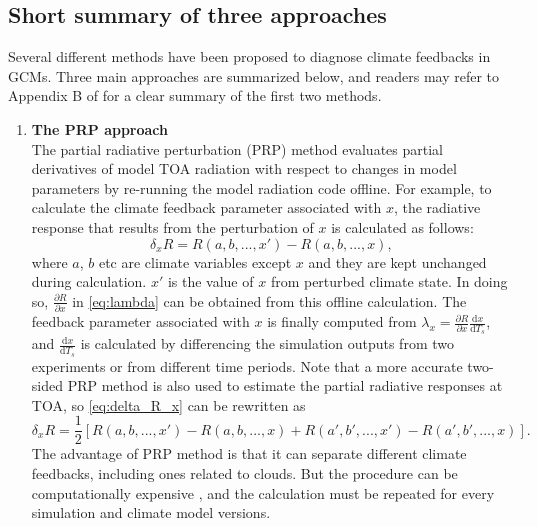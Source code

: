 \subsection{Short summary of three approaches}
\label{sec:three_climate_fbk_methods}

Several different methods have been proposed to diagnose climate feedbacks in GCMs. Three main approaches are summarized below, and readers may refer to Appendix B of \cite{Bony2006} for a clear summary of the first two methods.%

\begin{enumerate}[label={(\arabic*)}]
    \item \textbf{The PRP approach}\\
    The partial radiative perturbation (PRP)  method \citep{Wetherald1988cloud} evaluates partial derivatives of model TOA radiation with respect to changes in model parameters by re-running the model radiation code offline. For example, to calculate the climate feedback parameter associated with $x$, the radiative response that results from the perturbation of $x$ is calculated as follows:
    \begin{equation}
        \delta_x R = R(a,b,...,x') - R(a,b,...,x),
        \label{eq:delta_R_x}
    \end{equation}
    where $a$, $b$ etc are climate variables except $x$ and they are kept unchanged during calculation. $x'$ is the value of $x$ from perturbed climate state. In doing so, $\frac{\partial R}{\partial x}$ in \eqref{eq:lambda} can be obtained from this offline calculation. The feedback parameter associated with $x$ is finally computed from $\lambda_x = \frac{\partial R}{\partial x}\frac{\mathrm{d} x}{\mathrm{d} T_s}$, and $\frac{\mathrm{d} x}{\mathrm{d} T_s}$ is calculated by differencing the simulation outputs from two experiments or from different time periods. Note that a more accurate two-sided PRP method \citep{Colman1997} is also used to estimate the partial radiative responses at TOA, so \eqref{eq:delta_R_x} can be rewritten as
    \begin{equation}
        \delta_x R = \frac{1}{2} \left[R(a,b,...,x') - R(a,b,...,x) + R(a',b',...,x') - R(a',b',...,x) \right].
    \end{equation}
    The advantage of PRP method is that it can separate different climate feedbacks, including ones related to clouds. But the procedure can be computationally expensive \citep{Soden2008}, and the calculation  must be repeated for every simulation and climate model versions.
    

\end{enumerate}

